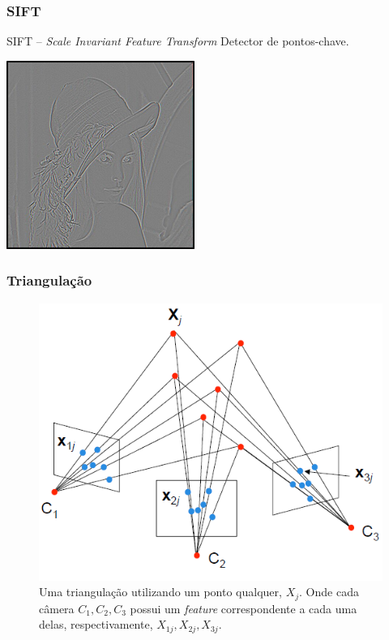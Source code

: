 \documentclass[table, usenames, svgnames, xcolor=dvipsnames]{beamer}
\begin{document}
\begin{frame}
\frametitle{\textbf{SIFT}}
	\begin{center}
		{SIFT -- \emph{Scale Invariant Feature Transform}}
		Detector de pontos-chave.
	\end{center}
\end{frame}

\begin{frame}
	\begin{center}
	 	\includegraphics[width=0.8\linewidth]{figs/lenaDoG.png}
	\end{center}
\end{frame}


\begin{frame}
\frametitle{\textbf{Triangulação}}
	\begin{center}
		\begin{figure} [!h]
	\centering
	\includegraphics[width=0.45\linewidth]{figs/triangulacao.png}
	\caption{%
	Uma triangulação utilizando um ponto qualquer, $X_j$. Onde cada câmera $C_1, C_2, C_3$ possui um \emph{feature} correspondente a cada uma delas, respectivamente, $X_{1j}, X_{2j}, X_{3j}$.
	}\label{fig:triangulacao}
\end{figure}
	\end{center}
\end{frame}
\end{document}
